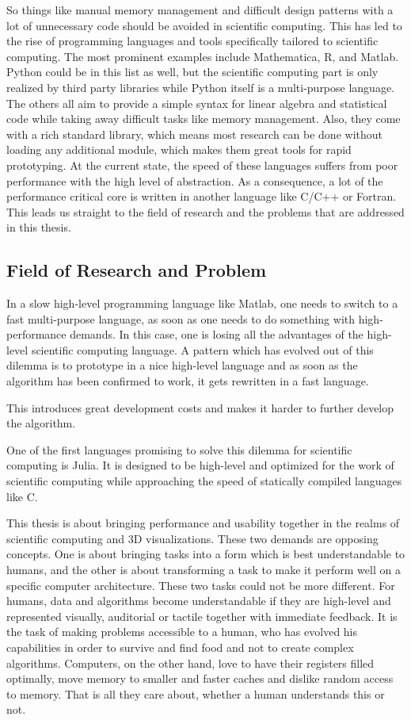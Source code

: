 So things like manual memory management and difficult design patterns with a lot of unnecessary code should be avoided in scientific computing.
This has led to the rise of programming languages and tools specifically tailored to scientific computing.
The most prominent examples include Mathematica, R, and Matlab. 
Python could be in this list as well, but the scientific computing part is only realized by third party libraries while Python itself is a multi-purpose language.
The others all aim to provide a simple syntax for linear algebra and statistical code while taking away difficult tasks like memory management. 
Also, they come with a rich standard library, which means most research can be done without loading any additional module, which makes them great tools for rapid prototyping.
At the current state, the speed of these languages suffers from poor performance with the high level of abstraction. 
As a consequence, a lot of the performance critical core is written in another language like C/C++ or Fortran. 
This leads us straight to the field of research and the problems that are addressed in this thesis.


\subsection{Field of Research and Problem}


In a slow high-level programming language like Matlab, one needs to switch to a fast multi-purpose language, as soon as one needs to do something with high-performance demands.
In this case, one is losing all the advantages of the high-level scientific computing language.
A pattern which has evolved out of this dilemma is to prototype in a nice high-level language and as soon as the algorithm has been confirmed to work, it gets rewritten in a fast language.

This introduces great development costs and makes it harder to further develop the algorithm.

One of the first languages promising to solve this dilemma for scientific computing is Julia. 
It is designed to be high-level and optimized for the work of scientific computing while approaching the speed of statically compiled languages like C.

This thesis is about bringing performance and usability together in the realms of scientific computing and 3D visualizations.
These two demands are opposing concepts. 
One is about bringing tasks into a form which is best understandable to humans, and the other is about transforming a task to make it perform well on a specific computer architecture.
These two tasks could not be more different. 
For humans, data and algorithms become understandable if they are high-level and represented visually, auditorial or tactile together with immediate feedback. 
It is the task of making problems accessible to a human, who has evolved his capabilities in order to survive and find food and not to create complex algorithms.
Computers, on the other hand, love to have their registers filled optimally, move memory to smaller and faster caches and dislike random access to memory. That is all they care about, whether a human understands this or not.

